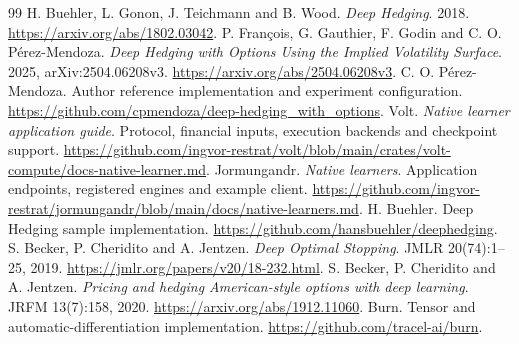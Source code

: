 \documentclass[8pt]{strategynet-journal}
\begin{document}
\begin{SNcolumns}
\begin{thebibliography}{99}
 H. Buehler, L. Gonon, J. Teichmann and B. Wood. \emph{Deep Hedging}. 2018. \url{https://arxiv.org/abs/1802.03042}.
 P. Fran\c{c}ois, G. Gauthier, F. Godin and C. O. P\'erez-Mendoza. \emph{Deep Hedging with Options Using the Implied Volatility Surface}. 2025, arXiv:2504.06208v3. \url{https://arxiv.org/abs/2504.06208v3}.
 C. O. P\'erez-Mendoza. Author reference implementation and experiment configuration. \url{https://github.com/cpmendoza/deep-hedging_with_options}.
 Volt. \emph{Native learner application guide}. Protocol, financial inputs, execution backends and checkpoint support. \url{https://github.com/ingvor-restrat/volt/blob/main/crates/volt-compute/docs-native-learner.md}.
 Jormungandr. \emph{Native learners}. Application endpoints, registered engines and example client. \url{https://github.com/ingvor-restrat/jormungandr/blob/main/docs/native-learners.md}.
 H. Buehler. Deep Hedging sample implementation. \url{https://github.com/hansbuehler/deephedging}.
 S. Becker, P. Cheridito and A. Jentzen. \emph{Deep Optimal Stopping}. JMLR 20(74):1--25, 2019. \url{https://jmlr.org/papers/v20/18-232.html}.
 S. Becker, P. Cheridito and A. Jentzen. \emph{Pricing and hedging American-style options with deep learning}. JRFM 13(7):158, 2020. \url{https://arxiv.org/abs/1912.11060}.
 Burn. Tensor and automatic-differentiation implementation. \url{https://github.com/tracel-ai/burn}.
\end{thebibliography}
\end{SNcolumns}
\end{document}
